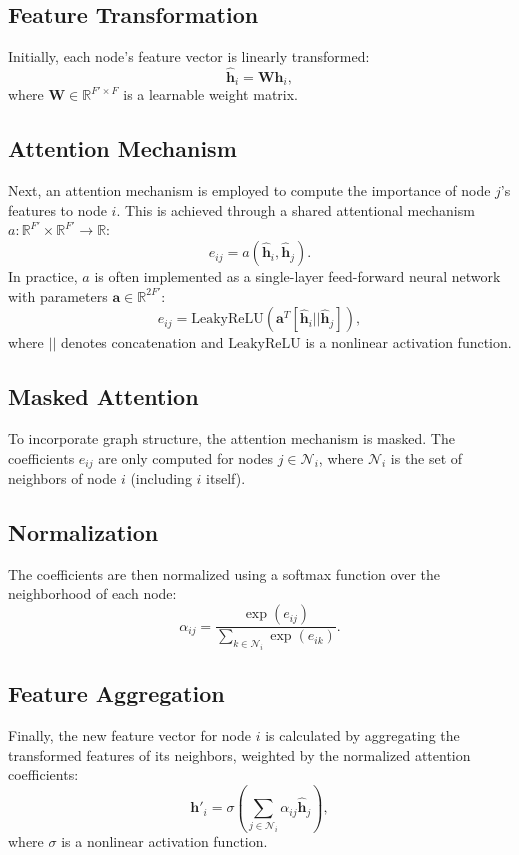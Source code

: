 \documentclass[11pt]{article}
\begin{document}
	\subsection{Feature Transformation}
	Initially, each node's feature vector is linearly transformed:
	\begin{equation}
		\hat{\mathbf{h}}_i = \mathbf{W} \mathbf{h}_i,
	\end{equation}
	where $\mathbf{W} \in \mathbb{R}^{F' \times F}$ is a learnable weight matrix.
	
	\subsection{Attention Mechanism}
	Next, an attention mechanism is employed to compute the importance of node $j$'s features to node $i$. This is achieved through a shared attentional mechanism $a: \mathbb{R}^{F'} \times \mathbb{R}^{F'} \rightarrow \mathbb{R}$:
	\begin{equation}
		e_{ij} = a(\hat{\mathbf{h}}_i, \hat{\mathbf{h}}_j).
	\end{equation}
	In practice, $a$ is often implemented as a single-layer feed-forward neural network with parameters $\mathbf{a} \in \mathbb{R}^{2F'}$:
	\begin{equation}
		e_{ij} = \text{LeakyReLU}\left( \mathbf{a}^T [\hat{\mathbf{h}}_i || \hat{\mathbf{h}}_j] \right),
	\end{equation}
	where $||$ denotes concatenation and $\text{LeakyReLU}$ is a nonlinear activation function.
	
	\subsection{Masked Attention}
	To incorporate graph structure, the attention mechanism is masked. The coefficients $e_{ij}$ are only computed for nodes $j \in \mathcal{N}_i$, where $\mathcal{N}_i$ is the set of neighbors of node $i$ (including $i$ itself).
	
	\subsection{Normalization}
	The coefficients are then normalized using a softmax function over the neighborhood of each node:
	\begin{equation}
		\alpha_{ij} = \frac{\exp(e_{ij})}{\sum_{k \in \mathcal{N}_i} \exp(e_{ik})}.
	\end{equation}
	
	\subsection{Feature Aggregation}
	Finally, the new feature vector for node $i$ is calculated by aggregating the transformed features of its neighbors, weighted by the normalized attention coefficients:
	\begin{equation}
		\mathbf{h}'_i = \sigma \left( \sum_{j \in \mathcal{N}_i} \alpha_{ij} \hat{\mathbf{h}}_j \right),
	\end{equation}
	where $\sigma$ is a nonlinear activation function.
	
\end{document}

